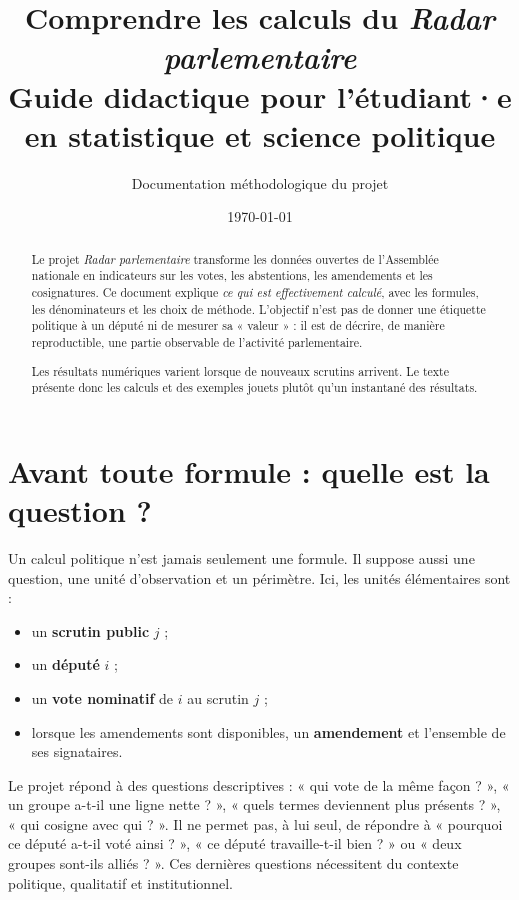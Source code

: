 \documentclass[11pt,a4paper]{article}
\title{Comprendre les calculs du \emph{Radar parlementaire}\\
\large Guide didactique pour l'étudiant·e en statistique et science politique}
\author{Documentation méthodologique du projet \code{radar}}
\date{\today}
\begin{document}
\maketitle

\begin{abstract}
Le projet \emph{Radar parlementaire} transforme les données ouvertes de
l'Assemblée nationale en indicateurs sur les votes, les abstentions, les
amendements et les cosignatures. Ce document explique \emph{ce qui est
effectivement calculé}, avec les formules, les dénominateurs et les choix de
méthode. L'objectif n'est pas de donner une étiquette politique à un député ni
de mesurer sa « valeur » : il est de décrire, de manière reproductible, une
partie observable de l'activité parlementaire.

Les résultats numériques varient lorsque de nouveaux scrutins arrivent. Le
texte présente donc les calculs et des exemples jouets plutôt qu'un instantané
des résultats.
\end{abstract}

\tableofcontents
\newpage

\section{Avant toute formule : quelle est la question ?}

Un calcul politique n'est jamais seulement une formule. Il suppose aussi une
question, une unité d'observation et un périmètre. Ici, les unités élémentaires
sont :

\begin{itemize}
  \item un \textbf{scrutin public} $j$ ;
  \item un \textbf{député} $i$ ;
  \item un \textbf{vote nominatif} de $i$ au scrutin $j$ ;
  \item lorsque les amendements sont disponibles, un \textbf{amendement} et
  l'ensemble de ses signataires.
\end{itemize}

Le projet répond à des questions descriptives : « qui vote de la même façon ?
», « un groupe a-t-il une ligne nette ? », « quels termes deviennent plus
présents ? », « qui cosigne avec qui ? ». Il ne permet pas, à lui seul, de
répondre à « pourquoi ce député a-t-il voté ainsi ? », « ce député travaille-t-il
bien ? » ou « deux groupes sont-ils alliés ? ». Ces dernières questions
nécessitent du contexte politique, qualitatif et institutionnel.
\end{document}
